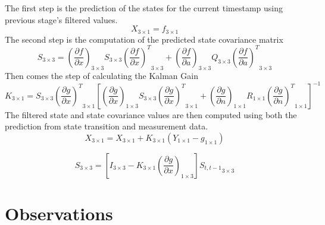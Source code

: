 \documentclass{article}
\begin{document}
The first step is the prediction of the states for the current timestamp using previous stage's filtered values.
\begin{equation}
{X}_{3 \times 1} =
{f}_{3 \times 1}
\end{equation}
The second step is the computation of the predicted state covariance matrix
\begin{equation}
{S}_{3 \times 3} =
{ \left( \frac{\partial f}{\partial x} \right) }_{3 \times 3}
{S}_{3 \times 3}
{ \left( \frac{\partial f}{\partial x} \right)^T }_{3 \times 3}
+
{ \left( \frac{\partial f}{\partial a} \right) }_{3 \times 3}
{Q}_{3 \times 3}
{ \left( \frac{\partial f}{\partial a} \right)^T }_{3 \times 3}
\end{equation}
Then comes the step of calculating the Kalman Gain
\begin{equation}
{K}_{3 \times 1} =
{S}_{3 \times 3}
{ \left( \frac{\partial g}{\partial x} \right)^T }_{3 \times 1}
\left[
{ \left( \frac{\partial g}{\partial x} \right) }_{1 \times 3}
{S}_{3 \times 3}
{ \left( \frac{\partial g}{\partial x} \right)^T }_{3 \times 1}
+
{ \left( \frac{\partial g}{\partial n} \right) }_{1 \times 1}
{R}_{1 \times 1}
{ \left( \frac{\partial g}{\partial n} \right)^T }_{1 \times 1}
\right]^{-1}
\end{equation}
The filtered state and state covariance values are then computed using both the prediction from state transition and measurement data.
\begin{equation}
{X}_{3 \times 1} =
{X}_{3 \times 1} + {K}_{3 \times 1}
({Y}_{1 \times 1} - {g}_{1 \times 1})
\end{equation}

\begin{equation}
{S}_{3 \times 3} =
\left[ {I}_{3 \times 3} - {K}_{3 \times 1}
{ \left( \frac{\partial g}{\partial x} \right) }_{1 \times 3}
\right] {S_{t,t-1}}_{3 \times 3}
\end{equation}

\pagebreak
\section{Observations}
\end{document}
